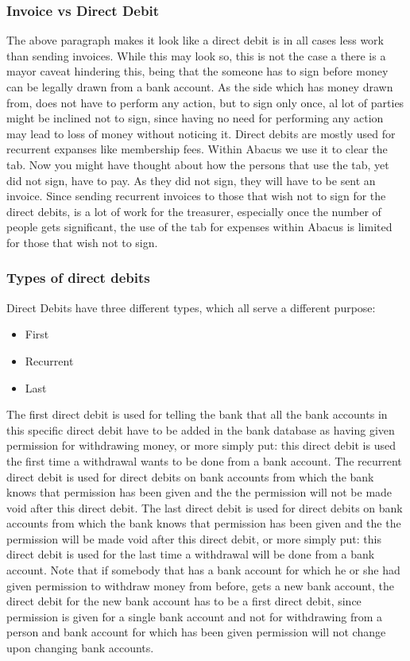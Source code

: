 \documentclass{report}
\begin{document}
\subsubsection{Invoice vs Direct Debit}
The above paragraph makes it look like a direct debit is in all cases less work than sending invoices. While this may look so, this is not the case a there is a mayor caveat hindering this, being that the someone has to sign before money can be legally drawn from a bank account. As the side which has money drawn from, does not have to perform any action, but to sign only once, al lot of parties might be inclined not to sign, since having no need for performing any action may lead to loss of money without noticing it. Direct debits are mostly used for recurrent expanses like membership fees. Within Abacus we use it to clear the tab. Now you might have thought about how the persons that use the tab, yet did not sign, have to pay. As they did not sign, they will have to be sent an invoice. Since sending recurrent invoices to those that wish not to sign for the direct debits, is a lot of work for the treasurer, especially once the number of people gets significant, the use of the tab for expenses within Abacus is limited for those that wish not to sign.   
\subsubsection{Types of direct debits}
Direct Debits have three different types, which all serve a different purpose:
\begin{itemize}
	\item First
	\item Recurrent
	\item Last
\end{itemize}
The first direct debit is used for telling the bank that all the bank accounts in this specific direct debit have to be added in the bank database as having given permission for withdrawing money, or more simply put: this direct debit is used the first time a withdrawal wants to be done from a bank account. 
The recurrent direct debit is used for direct debits on bank accounts from which the bank knows that permission has been given and the the permission will not be made void after this direct debit.
The last direct debit is used for direct debits on bank accounts from which the bank knows that permission has been given and the the permission will be made void after this direct debit, or more simply put: this direct debit is used for the last time a withdrawal will be done from a bank account. Note that if somebody that has a bank account for which he or she had given permission to withdraw money from before, gets a new bank account, the direct debit for the new bank account has to be a first direct debit, since permission is given for a single bank account and not for withdrawing from a person and bank account for which has been given permission will not change upon changing bank accounts.   
\end{document}
